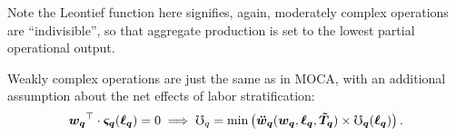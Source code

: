 \documentclass[hidelinks, nonatbib]{elsarticle}
\begin{document}
\begin{axiom}
\begin{subaxiom}
    Note the Leontief function here signifies, again, moderately complex operations are ``indivisible'', so that aggregate production is set to the lowest partial operational output.
    \end{subaxiom}

    \begin{subaxiom}
        \label{woca}
        Weakly complex operations are just the same as in MOCA, with an additional assumption about the net effects of labor stratification:
        \begin{gather}
            \boldsymbol{w_{q}} ^ {\top}
            \cdot 
            \boldsymbol{\varsigma_{q}}(
                \boldsymbol{\ell_{q}}
            )
            =
            0
            \implies
            \mho_q
            =
            \min\left(
                \boldsymbol{\ddot{w}_{q}}(
                    \boldsymbol{w_{q}},
                    \boldsymbol{\ell_{q}},
                    \boldsymbol{\tilde{T}_{q}}
                )
                \times
                \boldsymbol{\mho_{q}}(
                    \boldsymbol{\ell_{q}}
                )
            \right)
            .
    \end{gather}


\end{subaxiom}
\end{axiom}
\end{document}
